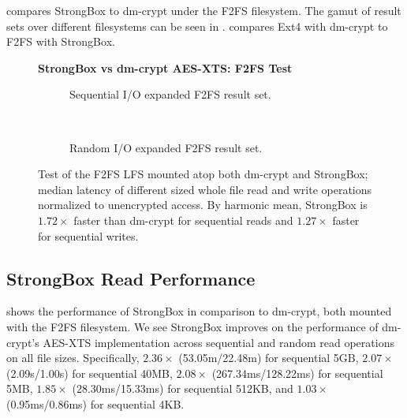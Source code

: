  compares StrongBox to dm-crypt under the F2FS
filesystem. The gamut of result sets over different filesystems can
be seen in . 
compares Ext4 with dm-crypt to F2FS with StrongBox.

\begin{figure}[ht]
    \textbf{StrongBox vs dm-crypt AES-XTS: F2FS Test}\par\medskip
    \begin{subfigure}{\linewidth}
        \centering
        {}
        \caption{Sequential I/O expanded F2FS result set.} \label{fig:microbench-f2fs-sequential}
    \end{subfigure}\\[1ex]
    \begin{subfigure}{\linewidth}
        \centering
        {}
        \caption{Random I/O expanded F2FS result set.} \label{fig:microbench-f2fs-random}
    \end{subfigure}
    \caption{Test of the F2FS LFS mounted atop both dm-crypt and
      StrongBox; median latency of different sized whole file read and
      write operations normalized to unencrypted access. By harmonic
      mean, StrongBox is $1.72\times$ faster than dm-crypt for sequential reads
      and $1.27\times$ faster for sequential writes.} \label{fig:microbench-f2fs}
\end{figure}

\subsection{StrongBox Read Performance}

 shows the performance of StrongBox in comparison to
dm-crypt, both mounted with the F2FS filesystem. We see StrongBox improves on
the performance of dm-crypt's AES-XTS implementation across sequential and
random read operations on all file sizes. Specifically, $2.36\times$
(53.05m/22.48m) for sequential 5GB, $2.07\times$ (2.09s/1.00s) for sequential
40MB, $2.08\times$ (267.34ms/128.22ms) for sequential 5MB, $1.85\times$
(28.30ms/15.33ms) for sequential 512KB, and $1.03\times$ (0.95ms/0.86ms) for
sequential 4KB\@.

